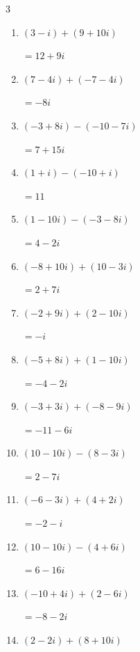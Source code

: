 \begin{multicols}{3}
\begin{enumerate}
        $\displaystyle =12+14i$

  \item $\displaystyle (3-i) + (9+10i)$

        $\displaystyle =12+9i$

  \item $\displaystyle (7-4i) + (-7-4i)$

        $\displaystyle =-8i$

  \item $\displaystyle (-3+8i) - (-10-7i)$

        $\displaystyle =7+15i$

  \item $\displaystyle (1+i) - (-10+i)$

        $\displaystyle =11$

  \item $\displaystyle (1-10i) - (-3-8i)$

        $\displaystyle =4-2i$

  \item $\displaystyle (-8+10i) + (10-3i)$

        $\displaystyle =2+7i$

  \item $\displaystyle (-2+9i) + (2-10i)$

        $\displaystyle =-i$

  \item $\displaystyle (-5+8i) + (1-10i)$

        $\displaystyle =-4-2i$

  \item $\displaystyle (-3+3i) + (-8-9i)$

        $\displaystyle =-11-6i$

  \item $\displaystyle (10-10i) - (8-3i)$

        $\displaystyle =2-7i$

  \item $\displaystyle (-6-3i) + (4+2i)$

        $\displaystyle =-2-i$

  \item $\displaystyle (10-10i) - (4+6i)$

        $\displaystyle =6-16i$

  \item $\displaystyle (-10+4i) + (2-6i)$

        $\displaystyle =-8-2i$

  \item $\displaystyle (2-2i) + (8+10i)$


\end{enumerate}
\end{multicols}
